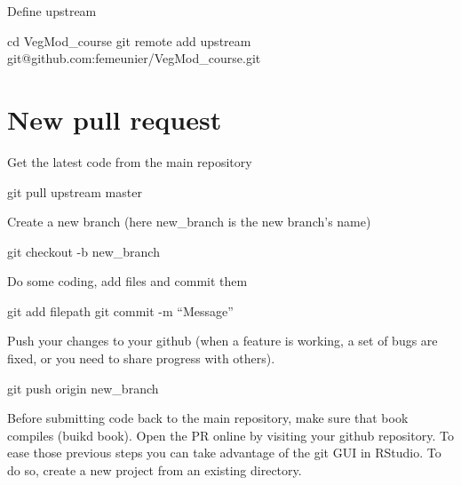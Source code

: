 \documentclass[oneside]{book}
\newenvironment{Shaded}{\begin{snugshade}}{\end{snugshade}}
\newcommand{\FunctionTok}[1]{\textcolor[rgb]{0.00,0.00,0.00}{#1}}
\newcommand{\BuiltInTok}[1]{#1}
\newcommand{\NormalTok}[1]{#1}
\begin{document}
Define upstream

\begin{Shaded}
\begin{Highlighting}[]
\BuiltInTok{cd}\NormalTok{ VegMod_course}
\FunctionTok{git}\NormalTok{ remote add upstream git@github.com:femeunier/VegMod_course.git}
\end{Highlighting}
\end{Shaded}

\section*{New pull request}\label{new-pull-request}

Get the latest code from the main repository

\begin{Shaded}
\begin{Highlighting}[]
\FunctionTok{git}\NormalTok{ pull upstream master}
\end{Highlighting}
\end{Shaded}

Create a new branch (here new\_branch is the new branch's name)

\begin{Shaded}
\begin{Highlighting}[]
\FunctionTok{git}\NormalTok{ checkout -b new_branch}
\end{Highlighting}
\end{Shaded}

Do some coding, add files and commit them

\begin{Shaded}
\begin{Highlighting}[]
\FunctionTok{git}\NormalTok{ add filepath}
\FunctionTok{git}\NormalTok{ commit -m “Message”}
\end{Highlighting}
\end{Shaded}

Push your changes to your github (when a feature is working, a set of
bugs are fixed, or you need to share progress with others).

\begin{Shaded}
\begin{Highlighting}[]
\FunctionTok{git}\NormalTok{ push origin new_branch}
\end{Highlighting}
\end{Shaded}

Before submitting code back to the main repository, make sure that book
compiles (buikd book). Open the PR online by visiting your github
repository. To ease those previous steps you can take advantage of the
git GUI in RStudio. To do so, create a new project from an existing
directory.
\end{document}
